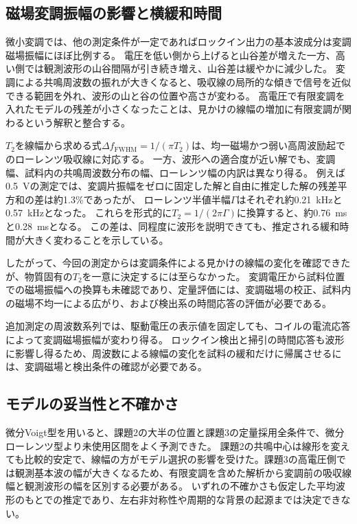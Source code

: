 \documentclass[dvipdfmx,a4paper,11pt]{jsarticle}
\begin{document}
\subsection{磁場変調振幅の影響と横緩和時間}
微小変調では、他の測定条件が一定であればロックイン出力の基本波成分は変調磁場振幅にほぼ比例する。
電圧を低い側から上げると山谷差が増えた一方、高い側では観測波形の山谷間隔が引き続き増え、山谷差は緩やかに減少した。
変調による共鳴周波数の振れが大きくなると、吸収線の局所的な傾きで信号を近似できる範囲を外れ、波形の山と谷の位置や高さが変わる。
高電圧で有限変調を入れたモデルの残差が小さくなったことは、見かけの線幅の増加に有限変調が関わるという解釈と整合する。

$T_2$を線幅から求める式$\Delta f_{\mathrm{FWHM}}=1/(\pi T_2)$は、均一磁場かつ弱い高周波励起でのローレンツ吸収線に対応する。
一方、波形への適合度が近い解でも、変調幅、試料内の共鳴周波数分布の幅、ローレンツ幅の内訳は異なり得る。
例えば\SI{0.5}{\volt}の測定では、変調片振幅をゼロに固定した解と自由に推定した解の残差平方和の差は約1.3\%であったが、
ローレンツ半値半幅$\Gamma$はそれぞれ約\SI{0.21}{\kilo\hertz}と\SI{0.57}{\kilo\hertz}となった。
これらを形式的に$T_2=1/(2\pi\Gamma)$に換算すると、約\SI{0.76}{\milli\second}と\SI{0.28}{\milli\second}となる。
この差は、同程度に波形を説明できても、推定される緩和時間が大きく変わることを示している。

したがって、今回の測定からは変調条件による見かけの線幅の変化を確認できたが、物質固有の$T_2$を一意に決定するには至らなかった。
変調電圧から試料位置での磁場振幅への換算も未確認であり、定量評価には、変調磁場の校正、試料内の磁場不均一による広がり、および検出系の時間応答の評価が必要である。

追加測定の周波数系列では、駆動電圧の表示値を固定しても、コイルの電流応答によって変調磁場振幅が変わり得る。
ロックイン検出と掃引の時間応答も波形に影響し得るため、周波数による線幅の変化を試料の緩和だけに帰属させるには、変調磁場と検出条件の確認が必要である。

\subsection{モデルの妥当性と不確かさ}
微分Voigt型を用いると、課題2の大半の位置と課題3の定量採用全条件で、微分ローレンツ型より未使用区間をよく予測できた。
課題2の共鳴中心は線形を変えても比較的安定で、線幅の方がモデル選択の影響を受けた。課題3の高電圧側では観測基本波の幅が大きくなるため、有限変調を含めた解析から変調前の吸収線幅と観測波形の幅を区別する必要がある。
いずれの不確かさも仮定した平均波形のもとでの推定であり、左右非対称性や周期的な背景の起源までは決定できない。
\end{document}
